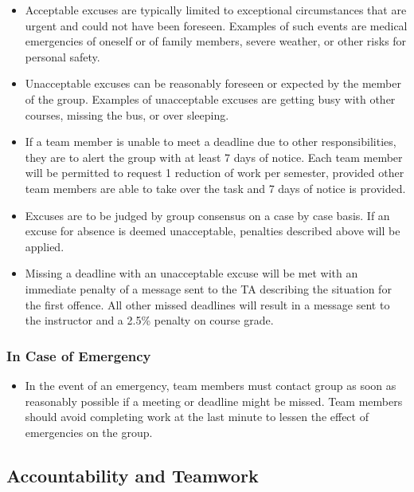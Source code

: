 \documentclass{article}
\begin{document}
\begin{itemize}
\item Acceptable excuses are typically limited to exceptional circumstances that are urgent and could not have been foreseen. Examples of such events are medical emergencies of oneself or of family members, 
severe weather, or other risks for personal safety.
\item Unacceptable excuses can be reasonably foreseen or expected by the member of the group. Examples of unacceptable excuses are getting busy with other courses, missing the bus, or over sleeping.
\item If a team member is unable to meet a deadline due to other responsibilities, they are to alert the group with at least 7 days of notice. Each team member will
be permitted to request 1 reduction of work per semester, provided other team members are able to take over the task and 7 days of notice is provided.
\item Excuses are to be judged by group consensus on a case by case basis. If an excuse for absence is deemed unacceptable, penalties described above will be applied.
\item Missing a deadline with an unacceptable excuse will be met with an immediate penalty of a message sent to the TA describing the situation for the first offence. 
All other missed deadlines will result in a message sent to the instructor and a 2.5\% penalty on course grade.
\end{itemize}

\subsubsection*{In Case of Emergency}
\begin{itemize}
  \item In the event of an emergency, team members must contact group as soon as reasonably possible if a meeting or deadline might be missed. Team members should avoid
  completing work at the last minute to lessen the effect of emergencies on the group.
  \end{itemize}

\subsection*{Accountability and Teamwork}
\end{document}
